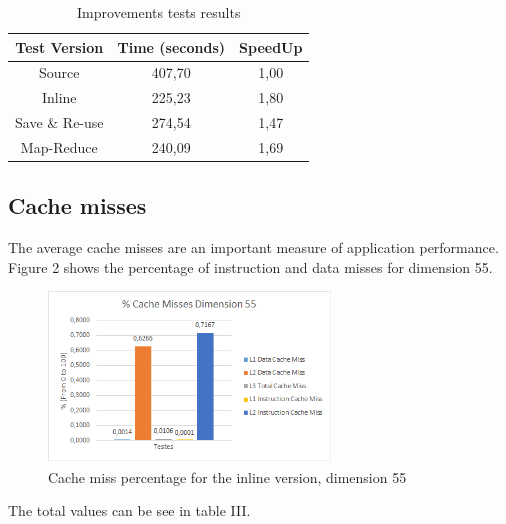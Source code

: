 \documentclass[conference]{IEEEtran}
\begin{document}
\begin{table}[ht!]
\centering
\label{my-label}

\begin{tabular}{|c|c|c|}
\hline
\rowcolor[HTML]{C0C0C0} 
{\color[HTML]{000000} Test Version} & {\color[HTML]{000000} Time (seconds)} & {\color[HTML]{000000} SpeedUp} \\ \hline
Source                          & 407,70            & 1,00          \\ \hline
Inline                          & 225,23            & 1,80          \\ \hline
Save \& Re-use                  & 274,54            & 1,47          \\ \hline
Map-Reduce                      & 240,09            & 1,69          \\ \hline
\end{tabular}
\caption{Improvements tests results}
\end{table}
    
\subsection{Cache misses}
The average cache misses are an important measure of application performance. Figure 2 shows the percentage of instruction and data misses for dimension 55. 

\begin{figure}[ht!]
\centering
\includegraphics[width=75mm]{imgSequential/Cachemisses}
\caption{Cache miss percentage for the inline version, dimension 55}
\end{figure}

The total values can be see in table III. 
\end{document}
